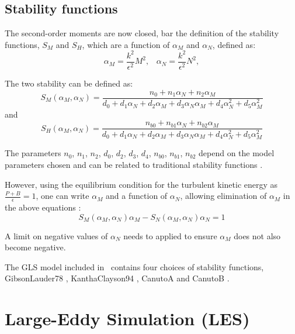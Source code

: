 \subsection{Stability functions}

The second-order moments are now closed, bar the definition of the stability functions, $S_M$ and $S_H$, 
which are a function of $\alpha_M$ and $\alpha_N$, defined as:
\begin{equation*}
\alpha_M=\frac{k^2}{\epsilon^2}M^2, \;\;\;
\alpha_N=\frac{k^2}{\epsilon^2}N^2,
\end{equation*}

The two stability can be defined as:
\begin{equation*}
S_M(\alpha_M,\alpha_N) = \frac{n_0+n_1\alpha_N+n_2\alpha_M}{d_0+d_1\alpha_N+d_2\alpha_M+d_3\alpha_N\alpha_M+d_4\alpha_N^2+d_5\alpha_M^2}
\end{equation*}
and
\begin{equation*}
S_H(\alpha_M,\alpha_N) = \frac{n_{b0}+n_{b1}\alpha_N+n_{b2}\alpha_M}{d_0+d_1\alpha_N+d_2\alpha_M+d_3\alpha_N\alpha_M+d_4\alpha_N^2+d_5\alpha_M^2}
\end{equation*}

The parameters $n_0$, $n_1$, $n_2$, $d_0$, $d_2$, $d_3$, $d_4$, $n_{b0}$, $n_{b1}$, $n_{b2}$ depend on
the model parameters chosen
and can be related to traditional stability functions \citep{umlauf2005}.

However, using the equilibrium condition for the turbulent kinetic energy as $\frac{P+B}{\epsilon}=1$, one can write
$\alpha_M$ and a function of $\alpha_N$, allowing elimination of $\alpha_M$ in the above equations \citep{umlauf2005}:
\begin{equation*}
S_M(\alpha_M,\alpha_N)\alpha_M - S_N(\alpha_M,\alpha_N)\alpha_N=1
\end{equation*}

A limit on negative values of $\alpha_N$ needs to applied to ensure $\alpha_M$ does not also become negative. 

The GLS model included in \fluidity\ contains four choices of stability functions, GibsonLauder78 \citep{gibson1978}, KanthaClayson94 \citep{kantha1994}, CanutoA and CanutoB \citep{canuto2001}.

\section{Large-Eddy Simulation (LES)}

